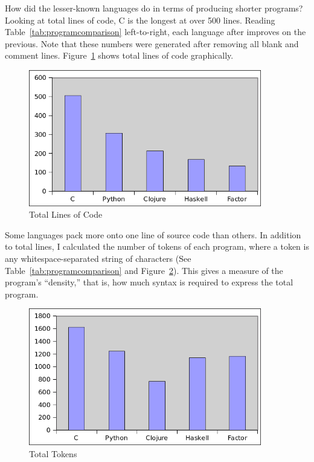 \documentclass{article}
\begin{document}
How did the lesser-known languages do in terms of producing shorter programs?
Looking at total lines of code, C is the longest at over 500 lines.  Reading
Table~\ref{tab:programcomparison} left-to-right, each language after improves on the previous.  Note that
these numbers were generated after removing all blank and comment lines.
Figure~\ref{fig:totallines} shows total lines of code graphically.

\begin{figure}[h]
    \centering
    \includegraphics[width=4in]{graphs/total-lines-of-code.png}
    \caption{Total Lines of Code \label{fig:totallines}}
\end{figure}

Some languages pack more onto one line of source code than others.  In addition
to total lines, I calculated the number of tokens of each program, where a token
is any whitespace-separated string of characters (See
Table~\ref{tab:programcomparison} and Figure~\ref{fig:totaltokens}).  This gives
a measure of the program's ``density,'' that is, how much syntax is required to
express the total program.

\begin{figure}[h]
    \centering
    \includegraphics[width=4in]{graphs/total-tokens.png}
    \caption{Total Tokens \label{fig:totaltokens}}
\end{figure}
\end{document}
